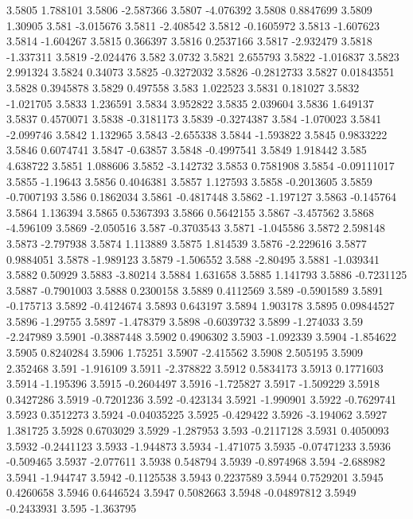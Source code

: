 3.5805  1.788101
3.5806  -2.587366
3.5807  -4.076392
3.5808  0.8847699
3.5809  1.30905
3.581  -3.015676
3.5811  -2.408542
3.5812  -0.1605972
3.5813  -1.607623
3.5814  -1.604267
3.5815  0.366397
3.5816  0.2537166
3.5817  -2.932479
3.5818  -1.337311
3.5819  -2.024476
3.582  3.0732
3.5821  2.655793
3.5822  -1.016837
3.5823  2.991324
3.5824  0.34073
3.5825  -0.3272032
3.5826  -0.2812733
3.5827  0.01843551
3.5828  0.3945878
3.5829  0.497558
3.583  1.022523
3.5831  0.181027
3.5832  -1.021705
3.5833  1.236591
3.5834  3.952822
3.5835  2.039604
3.5836  1.649137
3.5837  0.4570071
3.5838  -0.3181173
3.5839  -0.3274387
3.584  -1.070023
3.5841  -2.099746
3.5842  1.132965
3.5843  -2.655338
3.5844  -1.593822
3.5845  0.9833222
3.5846  0.6074741
3.5847  -0.63857
3.5848  -0.4997541
3.5849  1.918442
3.585  4.638722
3.5851  1.088606
3.5852  -3.142732
3.5853  0.7581908
3.5854  -0.09111017
3.5855  -1.19643
3.5856  0.4046381
3.5857  1.127593
3.5858  -0.2013605
3.5859  -0.7007193
3.586  0.1862034
3.5861  -0.4817448
3.5862  -1.197127
3.5863  -0.145764
3.5864  1.136394
3.5865  0.5367393
3.5866  0.5642155
3.5867  -3.457562
3.5868  -4.596109
3.5869  -2.050516
3.587  -0.3703543
3.5871  -1.045586
3.5872  2.598148
3.5873  -2.797938
3.5874  1.113889
3.5875  1.814539
3.5876  -2.229616
3.5877  0.9884051
3.5878  -1.989123
3.5879  -1.506552
3.588  -2.80495
3.5881  -1.039341
3.5882  0.50929
3.5883  -3.80214
3.5884  1.631658
3.5885  1.141793
3.5886  -0.7231125
3.5887  -0.7901003
3.5888  0.2300158
3.5889  0.4112569
3.589  -0.5901589
3.5891  -0.175713
3.5892  -0.4124674
3.5893  0.643197
3.5894  1.903178
3.5895  0.09844527
3.5896  -1.29755
3.5897  -1.478379
3.5898  -0.6039732
3.5899  -1.274033
3.59  -2.247989
3.5901  -0.3887448
3.5902  0.4906302
3.5903  -1.092339
3.5904  -1.854622
3.5905  0.8240284
3.5906  1.75251
3.5907  -2.415562
3.5908  2.505195
3.5909  2.352468
3.591  -1.916109
3.5911  -2.378822
3.5912  0.5834173
3.5913  0.1771603
3.5914  -1.195396
3.5915  -0.2604497
3.5916  -1.725827
3.5917  -1.509229
3.5918  0.3427286
3.5919  -0.7201236
3.592  -0.423134
3.5921  -1.990901
3.5922  -0.7629741
3.5923  0.3512273
3.5924  -0.04035225
3.5925  -0.429422
3.5926  -3.194062
3.5927  1.381725
3.5928  0.6703029
3.5929  -1.287953
3.593  -0.2117128
3.5931  0.4050093
3.5932  -0.2441123
3.5933  -1.944873
3.5934  -1.471075
3.5935  -0.07471233
3.5936  -0.509465
3.5937  -2.077611
3.5938  0.548794
3.5939  -0.8974968
3.594  -2.688982
3.5941  -1.944747
3.5942  -0.1125538
3.5943  0.2237589
3.5944  0.7529201
3.5945  0.4260658
3.5946  0.6446524
3.5947  0.5082663
3.5948  -0.04897812
3.5949  -0.2433931
3.595  -1.363795
